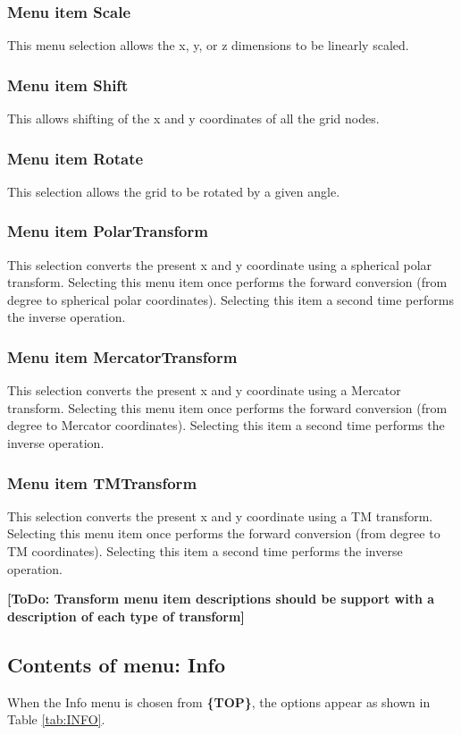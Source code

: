 \documentclass{article}
\begin{document}
\subsubsection{Menu item Scale}
This menu selection allows the x, y, or z dimensions to be linearly scaled.

\subsubsection[Menu item Shift]{Menu item Shift}
This allows shifting of the x and y coordinates of all the grid nodes.

\subsubsection{Menu item Rotate}
This selection allows the grid to be rotated by a given angle.

\subsubsection{Menu item PolarTransform}
This selection converts the present x and y coordinate using a spherical polar transform.  Selecting this menu item once performs the forward conversion (from degree to spherical polar coordinates).  Selecting this item a second time performs the inverse operation.


\subsubsection{Menu item MercatorTransform}
This selection converts the present x and y coordinate using a Mercator transform.  Selecting this menu item once performs the forward conversion (from degree to Mercator coordinates).  Selecting this item a second time performs the inverse operation.

\subsubsection{Menu item TMTransform}
This selection converts the present x and y coordinate using a TM transform.  Selecting this menu item once performs the forward conversion (from degree to TM coordinates).  Selecting this item a second time performs the inverse operation.

\textbf{[ToDo: Transform menu item descriptions should be support with a description of each type of transform]}


\subsection{Contents of menu: Info}
When the Info menu is chosen from \textbf{\{TOP\}}, the options appear as shown in Table \ref{tab:INFO}.
\end{document}
